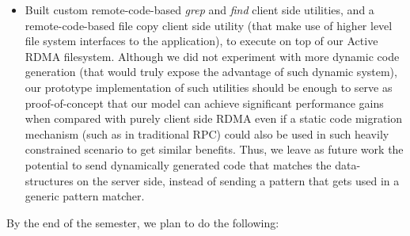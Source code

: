 \documentclass[10pt]{article}
\begin{document}
\begin{itemize}
\item Built custom remote-code-based \emph{grep} and \emph{find}
  client side utilities, and a remote-code-based file copy client side
  utility (that make use of higher level file system interfaces to the
  application), to execute on top of our Active RDMA filesystem. Although we did not experiment with more dynamic code generation (that would truly expose the advantage of such dynamic system), our prototype implementation of such utilities should be enough to serve as proof-of-concept that our model can achieve significant performance gains when compared with purely client side RDMA even if a static code migration mechanism (such as in traditional RPC) could also be used in such heavily constrained scenario to get similar benefits. Thus, we leave as future work the potential to send dynamically generated code that matches the data-structures on the server side, instead of sending a pattern that gets used in a generic pattern matcher. 

\end{itemize}

By the end of the semester, we plan to do the following:
\end{document}
